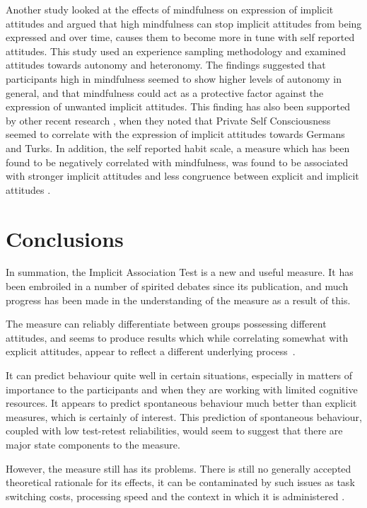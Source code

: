 Another study \cite{Levesque2007} looked at the effects of mindfulness on expression of implicit attitudes and argued that high mindfulness can stop implicit attitudes from being expressed and over time, causes them to become more in tune with self reported attitudes. This study used an experience sampling methodology and examined attitudes towards autonomy and heteronomy. The findings suggested that participants high in mindfulness seemed to show higher levels of autonomy in general, and that mindfulness could act as a protective factor against the expression of unwanted implicit attitudes.  This finding has also been supported by other recent research \cite{Gschwendner2006}, when they noted that Private Self Consciousness seemed to correlate with the expression of implicit attitudes towards Germans and Turks. In addition, the self reported habit scale, a measure which has been found to be negatively correlated with mindfulness, was found to be associated with stronger implicit attitudes and less congruence between explicit and implicit attitudes \cite{Conner2007}. 





\section{Conclusions}
\label{sec:conclusions}


In summation, the Implicit Association Test is a new and useful measure. It has been embroiled in a number of spirited debates since its publication, and much progress has been made in the understanding of the measure as a result of this. 

The measure can reliably differentiate between groups possessing different attitudes, and seems to produce results which while correlating somewhat with explicit attitudes, appear to reflect a different underlying process~\cite{Nosek2007a}. 

It can predict behaviour quite well in certain situations, especially in matters of importance to the participants and when they are working with limited cognitive resources. It appears to predict spontaneous behaviour much better than explicit measures, which is certainly of interest. This prediction of spontaneous behaviour, coupled with low test-retest reliabilities, would seem to suggest that there are major state components to the measure. 

However, the measure still has its problems. There is still no generally accepted theoretical rationale for its effects, it can be contaminated by such issues as task switching costs\cite{Klauer2005}, processing speed\cite{Blanton2006} and the context in which it is administered \cite{Boysen2006}. 

